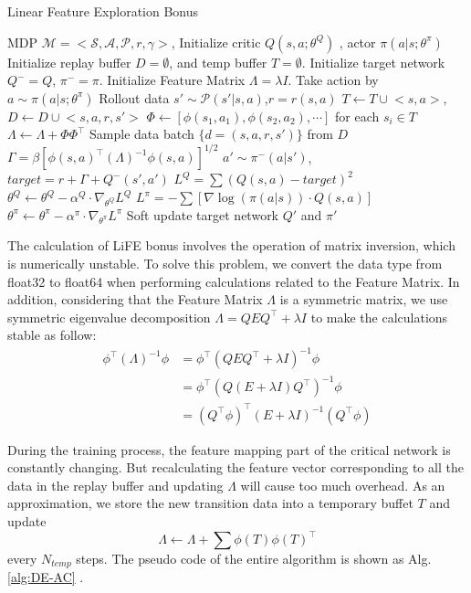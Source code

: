 \begin{algorithm}[!htb]
    \caption{Linear Feature Exploration Bonus}
    \label{alg:DE-AC}
    \begin{algorithmic}
         MDP $\mathcal{M} = <\mathcal{S},\mathcal{A},\mathcal{P},r,\gamma>$,
        \STATE Initialize critic $Q(s,a;\theta^Q)$ , actor $\pi(a|s;\theta^\pi)$
        \STATE Initialize replay buffer $D = \emptyset$, and temp buffer $T = \emptyset$.
        \STATE Initialize target network $Q^-= Q$, $\pi^-= \pi$.
        \STATE Initialize Feature Matrix $\Lambda = \lambda I$.
        \STATE Take action by $a \sim \pi(a|s;\theta^\pi)$
        \STATE Rollout data $s' \sim \mathcal{P}(s'|s,a)$,$r = r(s,a)$
        \STATE $T \leftarrow T\cup {<s,a>}$,$D \leftarrow D\cup {<s,a,r,s'>}$
        \STATE $\Phi \leftarrow [\phi(s_1,a_1),\phi(s_2,a_2),\cdots ]$ for each $s_i\in T$
        \STATE $\Lambda \leftarrow \Lambda + \Phi \Phi^\top $
        \ENDIF 
        \STATE Sample data batch $\{d=(s,a,r,s')\}$ from $D$
        \STATE $\Gamma = \beta [\phi(s,a)^\top(\Lambda)^{-1}\phi(s,a)]^{1/2}$
        \STATE $a'\sim \pi^-(a|s')$, $target  = r + \Gamma + Q^-(s',a')$
        \STATE $L^Q=\sum(Q(s,a)- target)^2$
        \STATE $\theta^Q \leftarrow \theta^Q - \alpha^Q\cdot\nabla_{\theta^Q} L^Q$
        \STATE $L^\pi=-\sum [\nabla\log(\pi(a|s)) \cdot Q(s,a)]$
        \STATE $\theta^\pi \leftarrow \theta^\pi -\alpha^\pi\cdot\nabla_{\theta^\pi} L^\pi$
        \STATE Soft update target network $Q'$ and $\pi'$
        \ENDFOR
     \end{algorithmic}
     \end{algorithm}

The calculation of LiFE bonus involves the operation of matrix inversion, which is numerically unstable. To solve this problem, we convert the data type from float32 to float64 when performing calculations related to the Feature Matrix. In addition, considering that the Feature Matrix $\Lambda$ is a symmetric matrix, we use symmetric eigenvalue decomposition $\Lambda = Q E Q^\top+\lambda I$ to make the calculations stable as follow:
\begin{equation}
    \begin{aligned}
    \phi^\top (\Lambda)^{-1}\phi &= \phi^\top (QEQ^\top+\lambda I)^{-1}\phi\\
    &= \phi^\top (Q(E+\lambda I)Q^\top)^{-1}\phi\\
    &= (Q^\top\phi)^\top (E+\lambda I)^{-1}(Q^\top\phi)
    \end{aligned}
\end{equation}

During the training process, the feature mapping part of the critical network is constantly changing. But recalculating the feature vector corresponding to all the data in the replay buffer and updating $\Lambda$ will cause too much overhead. As an approximation, we store the new transition data into a temporary buffet $T$ and update 
\[\Lambda \leftarrow \Lambda+ \sum \phi(T)\phi(T)^\top\]
 every $N_{temp}$ steps. The pseudo code of the entire algorithm is shown as Alg. \ref{alg:DE-AC} .

